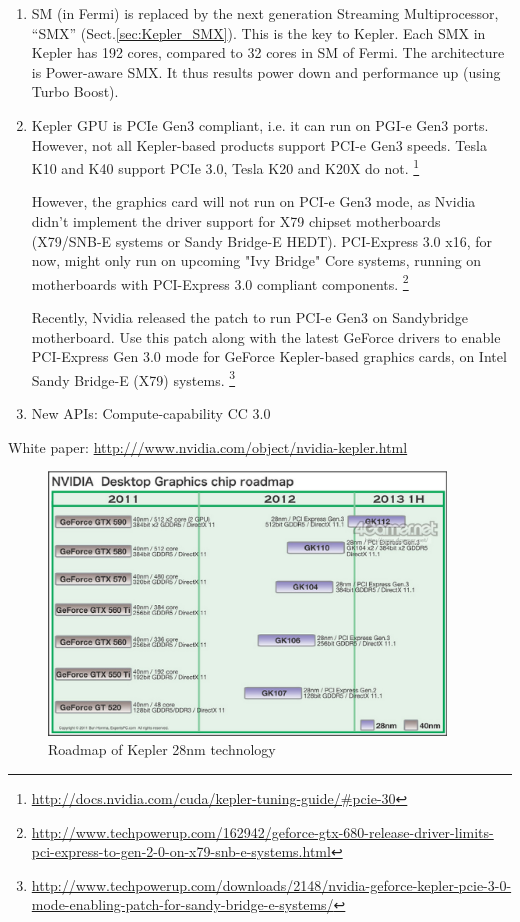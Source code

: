\begin{enumerate}
  \item SM (in Fermi) is replaced by the next generation Streaming
  Multiprocessor, ``SMX'' (Sect.\ref{sec:Kepler_SMX}). This is the key to Kepler.
  Each SMX in Kepler has 192 cores, compared to 32 cores in SM of Fermi. 
  The architecture is Power-aware SMX. It thus results power down and
  performance up (using Turbo Boost).  

  \item Kepler GPU is PCIe Gen3 compliant, i.e. it can run on PGI-e Gen3 ports.
  However, not all Kepler-based products support PCI-e Gen3 speeds. Tesla K10
  and K40 support PCIe 3.0, Tesla K20 and K20X do not.
  \footnote{\url{http://docs.nvidia.com/cuda/kepler-tuning-guide/\#pcie-30}}

  
However, the graphics card will not run on PCI-e Gen3 mode, as Nvidia didn't
implement the driver support for X79 chipset motherboards (X79/SNB-E systems or
Sandy Bridge-E HEDT). PCI-Express 3.0 x16, for now, might only run on upcoming
"Ivy Bridge" Core systems, running on motherboards with PCI-Express 3.0
compliant components.
\footnote{\url{http://www.techpowerup.com/162942/geforce-gtx-680-release-driver-limits-pci-express-to-gen-2-0-on-x79-snb-e-systems.html}}
  
Recently, Nvidia released the patch to run PCI-e Gen3 on Sandybridge
motherboard. Use this patch along with the latest GeForce drivers to enable
PCI-Express Gen 3.0 mode for GeForce Kepler-based graphics cards, on Intel Sandy
Bridge-E (X79) systems.
\footnote{\url{http://www.techpowerup.com/downloads/2148/nvidia-geforce-kepler-pcie-3-0-mode-enabling-patch-for-sandy-bridge-e-systems/}}
  
  \item New APIs: Compute-capability CC 3.0
  
\end{enumerate}
White paper: \url{http:///www.nvidia.com/object/nvidia-kepler.html}


\begin{figure}[hbt]
  \centerline{\includegraphics[height=7cm,
    angle=0]{./images/kepler_roadmap.eps}}
  \caption{Roadmap of Kepler 28nm technology}
  \label{fig:kepler_roadmap}
\end{figure}



